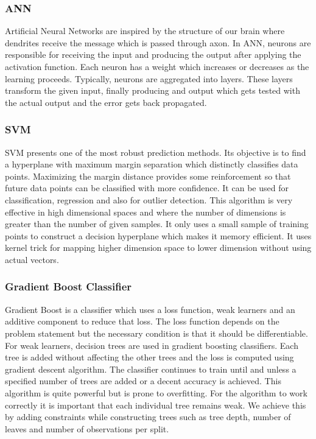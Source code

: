 \subsubsection{ANN}
\label{subsubsection:ann}
Artificial Neural Networks are inspired by the structure of our brain where dendrites receive the message which is passed through axon\cite{book:ann}. In ANN, neurons are responsible for receiving the input and producing the output after applying the activation function. Each neuron has a weight which increases or decreases as the learning proceeds. Typically, neurons are aggregated into layers. These layers transform the given input, finally producing and output which gets tested with the actual output and the error gets back propagated. 

\subsubsection{SVM}
\label{subsubsection:svm}
SVM presents one of the most robust prediction methods\cite{article:svm}. Its objective is to find a hyperplane with maximum margin separation which distinctly classifies data points. Maximizing the margin distance provides some reinforcement so that future data points can be classified with more confidence. It can be used for classification, regression and also for outlier detection. This algorithm is very effective in high dimensional spaces and where the number of dimensions is greater than the number of given samples. It only uses a small sample of training points to construct a decision hyperplane which makes it memory efficient. It uses kernel trick for mapping higher dimension space to lower dimension without using actual vectors.

\subsubsection{Gradient Boost Classifier}
\label{subsubsection:gradientBoost}
Gradient Boost is a classifier which uses a loss function, weak learners and an additive component to reduce that loss\cite{article:gradientBoosting}. The loss function depends on the problem statement but the necessary condition is that it should be differentiable. For weak learners, decision trees are used in gradient boosting classifiers. Each tree is added without affecting the other trees and the loss is computed using gradient descent algorithm. The classifier continues to train until and unless a specified number of trees are added or a decent accuracy is achieved. This algorithm is quite powerful but is prone to overfitting. For the algorithm to work correctly it is important that each individual tree remains weak. We achieve this by adding constraints while constructing trees such as tree depth, number of leaves and number of observations per split.

